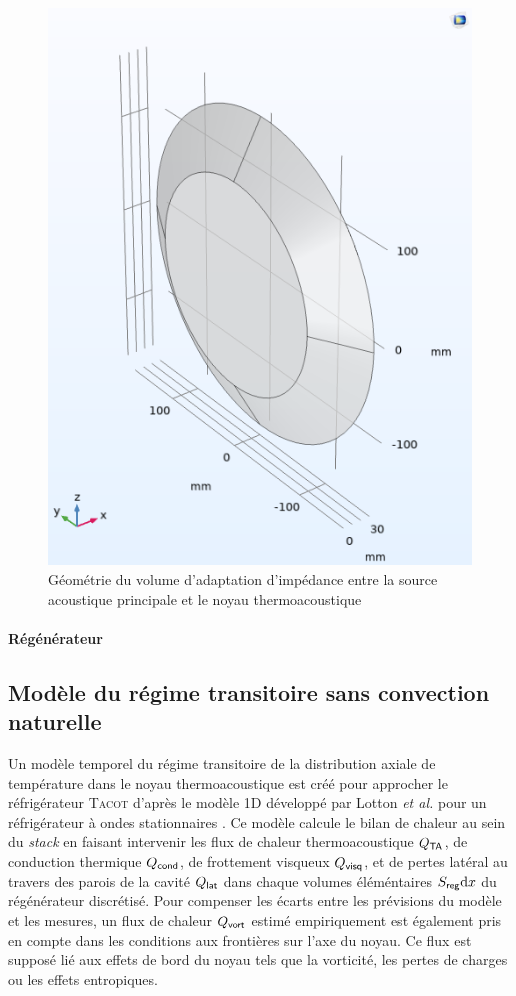 \begin{figure}[!ht]
    \centering
    \includegraphics[width=.5\textwidth]{../fig/fig_ConvNatComsol/Geometry.png}
    \caption{Géométrie du volume d'adaptation d'impédance entre la source acoustique principale et le noyau thermoacoustique}
    \label{fig:CaviteConvNat_ComsolGeometrie}
\end{figure}

\paragraph{Régénérateur}

\subsection{Modèle du régime transitoire sans convection naturelle} \label{chap:ModeleTransoitoire_SansConvNat}
Un modèle temporel du régime transitoire de la distribution axiale de température dans le noyau thermoacoustique est créé pour approcher le réfrigérateur \textsc{Tacot} d'après le modèle 1D développé par Lotton \textit{et al.} pour un réfrigérateur à ondes stationnaires \cite{lotton_transient_2009}. Ce modèle calcule le bilan de chaleur au sein du \textit{stack} en faisant intervenir les flux de chaleur thermoacoustique $Q_{\sf TA}$, de conduction thermique $Q_{\sf cond}$, de frottement visqueux $Q_{\sf visq}$, et de pertes latéral au travers des parois de la cavité $Q_{\sf lat}$ dans chaque volumes éléméntaires $S_{\sf reg} \mathrm{d} x$ du régénérateur discrétisé. Pour compenser les écarts entre les prévisions du modèle et les mesures, un flux de chaleur $Q_{\sf vort}$ estimé empiriquement est également pris en compte dans les conditions aux frontières sur l'axe du noyau. Ce flux est supposé lié aux effets de bord du noyau tels que la vorticité, les pertes de charges ou les effets entropiques.

